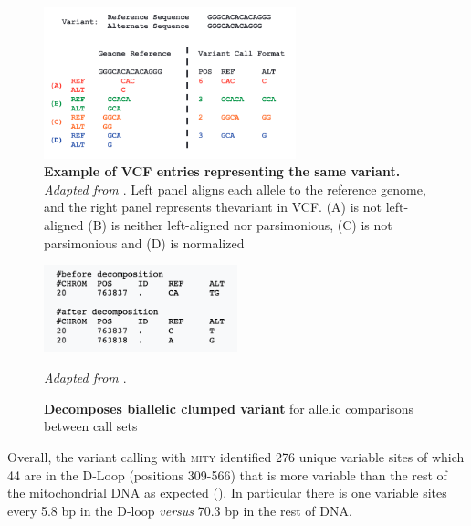 \begin{figure}[H]
\centering
\includegraphics[width=0.65\textwidth]{Fig/vtNormalizeTan.png}
\decoRule
\caption{\textbf{Example  of  VCF  entries  representing  the  same  variant.} \textit{ Adapted from \cite{tan2015unified}}. Left  panel aligns each allele to the reference genome, and the right panel represents thevariant in VCF. (A) is not left-aligned (B) is neither left-aligned nor parsimonious, (C) is not parsimonious and (D) is normalized}
\label{fig:vtNorm}
\end{figure}

\begin{figure}[H]
\centering
\includegraphics[width=0.5\textwidth]{Fig/vtDecompose.png}
\decoRule
\caption{\textbf{Decomposes biallelic clumped variant} for allelic comparisons between call sets} \textit{ Adapted from \cite{tan2015unified}}. 
\label{fig:vtDecomp}
\end{figure}

Overall, the variant calling with \textsc{mity} identified 276 unique variable sites of which 44 are in the D-Loop (positions 309-566) that is more variable than the rest of the mitochondrial DNA as expected (\cite{chinnery2014mitochondrial}). In particular there is one variable sites every 5.8 bp in the D-loop \textit{versus} 70.3 bp in the rest of DNA.\\


